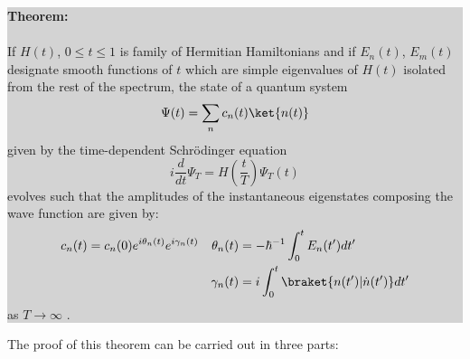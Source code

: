 \documentclass{article}
\begin{document}
\colorbox{lightgray}{
\begin{minipage}{0.9\textwidth}
\noindent\textbf{Theorem:}\\
\\
If $H(t)$, $0 \leq t \leq 1$ is  family of Hermitian Hamiltonians and if $E_n(t)$, $E_m(t)$ designate smooth functions of $t$ which are simple eigenvalues of $H(t)$ isolated from the rest of the spectrum, the state of a quantum system \[\Psi(t) = \sum_{n} c_{n}(t)\ket{n(t)}\] given by the time-dependent Schrödinger equation
  \[i\frac{d}{dt}\Psi_{T} = H(\frac{t}{T})\Psi_{T}(t)\]
evolves such that the amplitudes of the instantaneous eigenstates composing the wave function are given by:
    \begin{align*} 
        c_{n}(t) = c_{n}(0)e^{i\theta_{n}(t)}e^{i\gamma_{n}(t)} &&
        \theta_{n}(t)  &= -\hbar^{-1} \int_{0}^{t} E_{n}(t^{\prime}) dt^{\prime}\\  
        && \gamma_{n}(t) &= i\int_{0}^{t} \braket{n(t^{\prime})|\dot{n}(t^{\prime})}
        dt^{\prime}
    \end{align*}
as $T \to \infty$ \cite{Born1928, Berry1984, Simon1983, Sakurai1994}.
\end{minipage}
}

The proof of this theorem can be carried out in three parts:\\  
\end{document}

